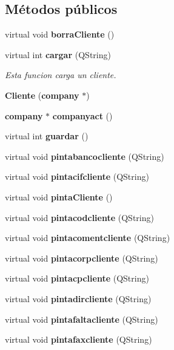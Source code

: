 \subsection*{M\'{e}todos p\'{u}blicos}
\begin{CompactItemize}
\item 
virtual void {\bf borra\-Cliente} ()\label{classCliente_a0}

\item 
virtual int {\bf cargar} (QString)\label{classCliente_a1}

\begin{CompactList}\small\item\em Esta funcion carga un cliente. \item\end{CompactList}\item 
{\bf Cliente} ({\bf company} $\ast$)\label{classCliente_a2}

\item 
{\bf company} $\ast$ {\bf companyact} ()\label{classCliente_a3}

\item 
virtual int {\bf guardar} ()\label{classCliente_a4}

\item 
virtual void {\bf pintabancocliente} (QString)\label{classCliente_a5}

\item 
virtual void {\bf pintacifcliente} (QString)\label{classCliente_a6}

\item 
virtual void {\bf pinta\-Cliente} ()
\item 
virtual void {\bf pintacodcliente} (QString)\label{classCliente_a8}

\item 
virtual void {\bf pintacomentcliente} (QString)\label{classCliente_a9}

\item 
virtual void {\bf pintacorpcliente} (QString)\label{classCliente_a10}

\item 
virtual void {\bf pintacpcliente} (QString)\label{classCliente_a11}

\item 
virtual void {\bf pintadircliente} (QString)\label{classCliente_a12}

\item 
virtual void {\bf pintafaltacliente} (QString)\label{classCliente_a13}

\item 
virtual void {\bf pintafaxcliente} (QString)\label{classCliente_a14}


\end{CompactItemize}
